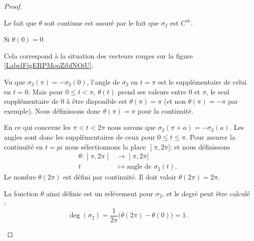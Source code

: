 \begin{proof}
\begin{subproof}
            Le fait que \( \theta\) soit continue est assuré par le fait que \( \sigma_2\) est \(  C^{\infty}\).

            \begin{subproof}
                \item[Si \( \theta(0)=0\)]

                    Cela correspond à la situation des vecteurs rouges sur la figure \ref{LabelFigERPMooZibfNOiU}.

                    Vu que \( \sigma_2(\pi)=-\sigma_2(0)\), l'angle de \( \sigma_2\) en \( t=\pi\) est le supplémentaire de celui en \( t=0\). Mais pour \( 0\leq t<\pi\), \( \theta(t)\) prend ses valeurs entre \( 0\) et \( \pi\), le seul supplémentaire de \( 0\) à être disponible est \( \theta(\pi)=\pi\) (et non \( \theta(\pi)=-\pi\) par exemple). Nous définissons donc \( \theta(\pi)=\pi\) pour la continuité.

                En ce qui concerne les \( \pi<t< 2\pi\) nous savons que \( \sigma_2(\pi+a)=-\sigma_2(a)\). Les angles sont donc les supplémentaires de ceux pour \( 0\leq t\leq \pi\). Pour assurer la continuité en \( t=pi\) nous sélectionnons la place \( \mathopen] \pi , 2\pi \mathclose]\); et nous définissons
                \begin{equation}
                    \begin{aligned}
                    \theta\colon \mathopen] \pi , 2\pi \mathclose[&\to \mathopen] \pi , 2\pi \mathclose] \\
                    t&\mapsto \text{angle de } \sigma_2(t). 
                    \end{aligned}
                \end{equation}
                Le nombre \( \theta(2\pi)\) est défini par continuité. Il doit valoir \( \theta(2\pi)=2\pi\).

                La fonction \( \theta\) ainsi définie est un relèvement pour \( \sigma_2\), et le degré peut être calculé :
                \begin{equation}
                    \deg(\sigma_2)=\frac{1}{ 2\pi }\big( \theta(2\pi)-\theta(0) \big)=1.
                \end{equation}

\newcommand{\CaptionFigERPMooZibfNOiU}{Les vecteurs représenant \( \sigma_2\) dans le cas où \( \beta'(0)\) est dans le sens de \( \ell_p\) ou dans le sens inverse. Pour le sport nous avons dessiné la situation avec une droite \( \ell\) quelconque plutôt que horizontale.}

                

\end{subproof}
\end{subproof}
\end{proof}
